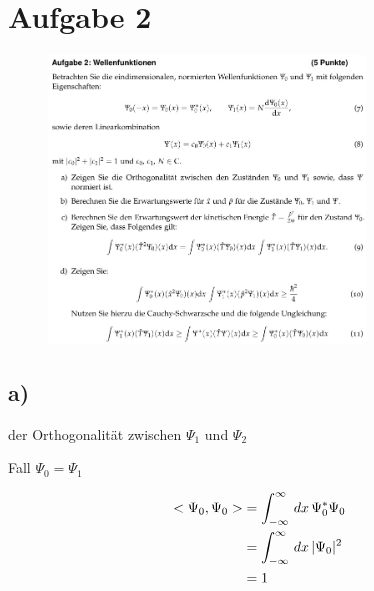 %
%
%



\section{Aufgabe 2}

\begin{figure}[H]
    \centering
    \includegraphics[width=0.75\textwidth]{images/Aufgabe_2.jpg}
    \label{fig:2}
\end{figure}

\subsection{a)}

\justifying der Orthogonalität zwischen 
$\Psi _1 $ und $\Psi _2 $

Fall $\Psi _0 = \Psi _1$

\begin{align}
    <\Psi _0 , \Psi _0> &= \int_{-\infty}^{\infty} \,dx\, \Psi _0^* \Psi _0\\
    &= \int_{-\infty}^{\infty} \,dx\, \lvert\Psi _0 \rvert^2 \\
    &=1
\end{align}

